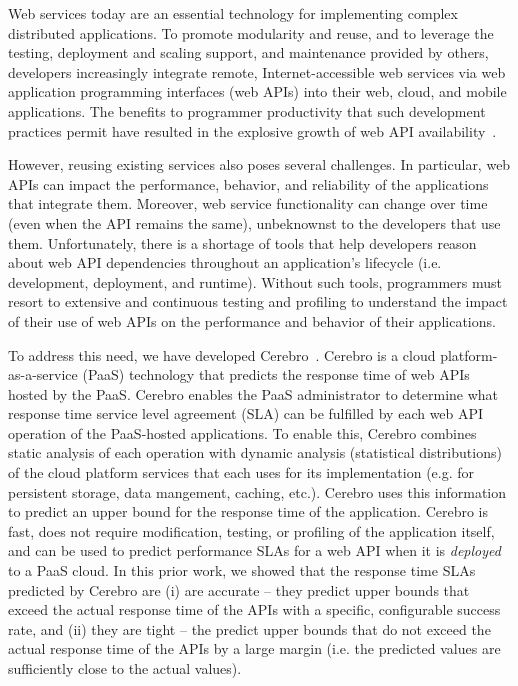 Web services today are an essential technology for implementing
complex distributed applications.  To promote modularity and reuse, 
and to leverage the testing, deployment and scaling support, and maintenance 
provided by others, developers increasingly integrate remote, Internet-accessible web services 
via web application programming interfaces (web APIs)
into their web, cloud, and mobile applications.  
The benefits to programmer productivity that such development practices
permit have resulted in the explosive growth of web API availability~\cite{pweb}.

However, reusing existing services also poses several challenges. In particular, 
web APIs can impact the performance, behavior, and reliability of the applications
that integrate them.  Moreover, web service functionality can change over time 
(even when the API remains the same), unbeknownst to the developers that use them.
Unfortunately, there is a shortage of tools that help developers 
reason about web API dependencies throughout an application's 
lifecycle (i.e. development, deployment, and runtime).  Without such tools, 
programmers must resort to extensive and continuous testing and profiling 
to understand the impact of their use of web APIs on the performance and behavior
of their applications.

To address this need, we have developed Cerebro~\cite{cerebro_paper}.
Cerebro is a cloud platform-as-a-service (PaaS) technology that
predicts the response time of web APIs hosted by the PaaS.
Cerebro enables the PaaS administrator to determine what response time service level 
agreement (SLA) can be fulfilled by each web API operation of the PaaS-hosted applications.
To enable this, Cerebro combines static analysis of each operation with 
dynamic analysis (statistical distributions) 
of the cloud platform services that each uses for its implementation 
(e.g. for persistent storage, data mangement, caching, etc.).
Cerebro uses this information to predict an upper bound for the response time 
of the application.  Cerebro is fast, does not require modification,
testing, or profiling of the application itself, and can be used to predict 
performance SLAs for a web API when it is \textit{deployed} to a PaaS cloud.
In this prior work, we showed that the response time SLAs predicted by Cerebro are
(i) are accurate -- they predict upper bounds that exceed the actual response time of the APIs
with a specific, configurable success rate, and (ii)
they are tight -- the predict upper bounds that do not exceed the actual 
response time of the APIs by a large 
margin (i.e. the predicted values are sufficiently close to the actual values). 

